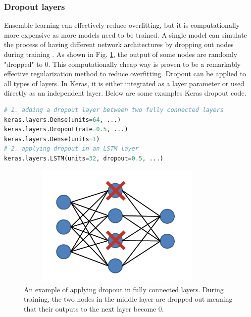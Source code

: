 \subsubsection{Dropout layers}
Ensemble learning can effectively reduce overfitting, but it is computationally more expensive as more models need to be trained. A single model can simulate the process of having different network architectures by dropping out nodes during training \cite{srivastava2014dropout}. As shown in Fig. \ref{fig_dropout}, the output of some nodes are randomly "dropped" to 0. This computationally cheap way is proven to be a remarkably effective regularization method to reduce overfitting. Dropout can be applied to all types of layers. In Keras, it is either integrated as a layer parameter or used directly as an independent layer. Below are some examples Keras dropout code.
\begin{lstlisting}[language=python,frame=single]
# 1. adding a dropout layer between two fully connected layers
keras.layers.Dense(units=64, ...)
keras.layers.Dropout(rate=0.5, ...)
keras.layers.Dense(units=1)
# 2. applying dropout in an LSTM layer
keras.layers.LSTM(units=32, dropout=0.5, ...)
\end{lstlisting}
\begin{figure}[h!]
\begin{center}
\includegraphics[height = 6cm, width = 10cm]{img/dropout.png}
\caption{An example of applying dropout in fully connected layers. During training, the two nodes in the middle layer are dropped out meaning that their outputs to the next layer become 0. \label{fig_dropout}}
\end{center}
\end{figure}
